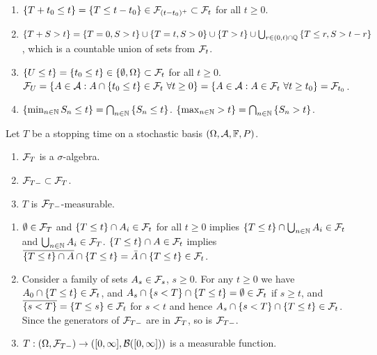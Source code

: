 \solution
\begin{enumerate}
\item $\left\{ T+t_{0}\leq t \right\} = \left\{ T\leq t-t_{0} \right\} \in
    \mathcal F_{(t-t_0)^{+}} \subset \mathcal F_{t}$ for all $t\geq 0$.
\item $\left\{ T+S > t \right\} = \left\{ T=0, S>t \right\} \cup \left\{ T=t,
    S>0 \right\} \cup \left\{ T>t \right\} \cup \bigcup_{r\in(0,t)\cap \mathbb Q}
    \left\{ T\leq r , S> t-r \right\}$, which is a countable union of sets from
    $\mathcal F_{t}$. 
\item $\left\{ U \leq t \right\} = \left\{ t_{0} \leq t \right\} \in \left\{
    \emptyset, \Omega \right\} \subset \mathcal F_{t}$ for all $t\geq 0$. 
    $\mathcal F_U = \left\{ A\in\mathcal A : A \cap \left\{ t_0 \leq t \right\}\in\mathcal F_t \
    \forall t\geq 0 \right\} = \left\{ A\in\mathcal A : A\in\mathcal F_t \ \forall t\geq t_0
    \right\} = \mathcal F_{t_0}$.
\item $\left\{ \min_{n\in\mathbb N} S_{n} \leq t \right\} = \bigcap_{n\in\mathbb N} \left\{
        S_{n}\leq t \right\}$. $\left\{ \max_{n\in\mathbb N} > t \right\} =
        \bigcap_{n\in\mathbb N} \left\{ S_{n} > t \right\}$.
\end{enumerate}

 Let $T$ be a stopping time on a
stochastic basis $(\Omega, \mathcal A, \mathbb F, P)$.
\begin{enumerate}
    \item $\mathcal F_T$ is a $\sigma$-algebra.
    \item $\mathcal F_{T-} \subset \mathcal F_{T}$.
    \item $T$ is $\mathcal F_{T-}$-measurable.
\end{enumerate}

\solution 
\begin{enumerate}
    \item $\emptyset \in \mathcal F_{T}$ and $\left\{ T\leq t \right\} \cap A_{i} \in
        \mathcal F_{t}$ for all $t\geq 0$ implies $\left\{ T\leq t \right\} \cap
        \bigcup_{n\in\mathbb N} A_i \in \mathcal F_t$ and $\bigcup_{n\in\mathbb N} A_i \in
        \mathcal F_{T}$. $\left\{ T \leq t \right\} \cap A \in\mathcal F_t$ implies
        $\overline{ \left\{ T\leq t \right\} \cap A } \cap \left\{ T\leq t
        \right\} = \bar A \cap \left\{ T\leq t \right\} \in \mathcal F_{t}$.
    \item Consider a family of sets $A_{s}\in\mathcal F_{s}$, $s\geq 0$. For any
        $t\geq 0$ we have $A_{0} \cap \left\{ {T\leq t} \right\} \in\mathcal F_{t}$,
        and $A_s \cap \left\{ s<T \right\} \cap \left\{ T\leq t \right\} =
        \emptyset \in\mathcal F_{t}$ if $s\geq t$, and $\overline{ \left\{ s<T
        \right\} } = \left\{ T\leq s \right\} \in \mathcal F_{t}$ for $s<t$ and hence
        $A_s \cap \left\{ s<T \right\} \cap \left\{ T\leq t \right\}
        \in\mathcal F_{t}$. Since the generators of $\mathcal F_{T-}$ are in $\mathcal F_{T}$, so is
        $\mathcal F_{T-}$.
    \item $T : (\Omega, \mathcal F_{T-}) \to ( [0,\infty], \mathcal B([0,\infty]) )$ is a
        measurable function.
\end{enumerate}

